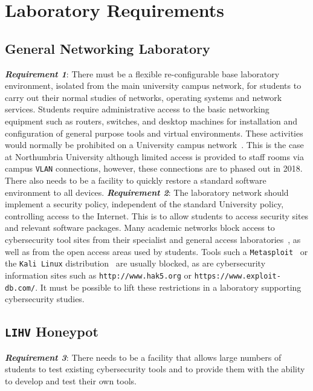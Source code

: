 \documentclass[10pt,journal]{IEEEtran}
\begin{document}
\section{Laboratory Requirements}\label{sec:TeachingRequire}

\subsection{General Networking Laboratory}\label{subsec:GeneralLab}

\noindent\textit{\textbf{Requirement 1}}: There must be a flexible re-configurable base laboratory environment, isolated from the main university campus network, for students to carry out their normal
studies of networks, operating systems and network services. Students require
administrative access to the basic networking equipment such as routers,
switches, and desktop machines for installation and configuration of general
purpose tools and virtual environments. These activities would normally be
prohibited on a University campus network~\cite{MGDL:13}. This is the case at Northumbria University although limited access is provided to staff rooms via campus \texttt{VLAN} connections, however, these connections are to phased out in 2018. There also needs to be a facility to quickly restore a standard software environment to all devices.
\newline\newline
\noindent\textit{\textbf{Requirement 2}}: The laboratory network should implement a security policy, independent of the
standard University policy, controlling access to the Internet. This is to
allow students to access security sites and relevant software packages. Many
academic networks block access to cybersecurity tool sites from their
specialist and general access laboratories~\cite{ACGO:06,YYLCHJ:04}, as well as
from the open access areas used by students. Tools such a
\texttt{Metasploit}~\cite{R7:17} or the \texttt{Kali Linux}
distribution~\cite{OS:17} are usually blocked, as are cybersecurity information
sites such as \texttt{http://www.hak5.org} or
\texttt{https://www.exploit-db.com/}. It must be possible to lift these
restrictions in a laboratory supporting cybersecurity studies.

\subsection{\texttt{LIHV} Honeypot}\label{subsec:LabHoneypot}

\noindent\textit{\textbf{Requirement 3}}:
There needs to be a facility that allows large numbers of students to test
existing cybersecurity tools and to provide them with the ability to develop
and test their own tools.
\end{document}
